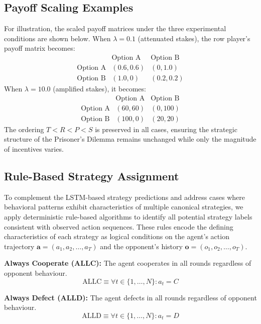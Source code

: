 \documentclass{article}
\begin{document}
\subsection{Payoff Scaling Examples}
\label{appendix:payoff_scaling}

For illustration, the scaled payoff matrices under the three experimental conditions are shown below. When $\lambda = 0.1$ (attenuated stakes), the row player's payoff matrix becomes:
\[
\begin{array}{c|cc}
 & \text{Option A} & \text{Option B} \\
\hline
\text{Option A} & (0.6, 0.6) & (0, 1.0) \\
\text{Option B} & (1.0, 0) &  (0.2, 0.2)
\end{array}
\]
When $\lambda = 10.0$ (amplified stakes), it becomes:
\[
\begin{array}{c|cc}
 & \text{Option A} & \text{Option B} \\
\hline
\text{Option A} & (60, 60) & (0, 100) \\
\text{Option B} & (100, 0) & (20, 20)
\end{array}
\]
The ordering $T < R < P < S$ is preserved in all cases, ensuring the strategic structure of the Prisoner's Dilemma remains unchanged while only the magnitude of incentives varies.

\subsection{Rule-Based Strategy Assignment}
\label{appendix:rule_based}

To complement the LSTM-based strategy predictions and address cases where behavioral patterns exhibit characteristics of multiple canonical strategies, we apply deterministic rule-based algorithms to identify all potential strategy labels consistent with observed action sequences. These rules encode the defining characteristics of each strategy as logical conditions on the agent's action trajectory $\mathbf{a} = (a_1, a_2, \ldots, a_T)$ and the opponent's history $\mathbf{o} = (o_1, o_2, \ldots, o_T)$.

\textbf{Always Cooperate (ALLC):} The agent cooperates in all rounds regardless of opponent behaviour.
\[
\text{ALLC} \equiv \forall t \in \{1, \ldots, N\}: a_t = C
\]

\textbf{Always Defect (ALLD):} The agent defects in all rounds regardless of opponent behaviour.
\[
\text{ALLD} \equiv \forall t \in \{1, \ldots, N\}: a_t = D
\]
\end{document}
